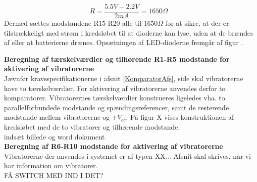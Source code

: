 \begin{equation}
R = \dfrac{5.5V - 2.2V}{2mA} = 1650\Omega
\end{equation}
\noindent Dermed sættes modstandene R$15$-R$20$ alle til $1650\Omega$ for at sikre, at der er tilstrækkeligt med strøm i kredsløbet til at dioderne kan lyse, uden at de brændes af eller at batterierne drænes. Opsætningen af LED-dioderne fremgår af figur .

\noindent\textbf{Beregning af tærskelværdier og tilhørende R1-R5 modstande for aktivering af  vibratorerne} \\
Jævnfør kravsspecifikationerne i afsnit \ref{KomparatorAfs}, side \pageref{KomparatorAfs} skal vibratorerne have to tærskelværdier. For aktivering af vibratorerne anvendes derfor to komparatorer. Vibratorernes tærskelværdier konstrueres ligeledes vha. to parallelforbundede modstande og spændingsreferencer, samt de resterende modstande mellem vibratorerne og $+V_{cc}$. På figur X vises konstruktionen af kredsløbet med de to vibratorer og tilhørende modstande. \\

indsæt billede og word dokument \\

\noindent\textbf{Beregning af R6-R10 modstande for aktivering af vibratorerne} \\
Vibratorerne der anvendes i systemet er af typen XX... Afsnit skal skrives, når vi har information om vibratorer.  \\

FÅ SWITCH MED IND I DET? \\

